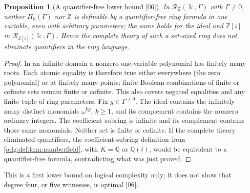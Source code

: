 \documentclass[11pt,oneside]{article}
\numberwithin{equation}{section}
\newtheorem{proposition}[proposition]{Proposition}
\theoremstyle{definition}
\theoremstyle{remark}
\newcommand{\Z}{\mathbb Z}
\newcommand{\Q}{\mathbb Q}
\newcommand{\src}[1]{\textup{\textsf{\small[#1]}}}
\begin{document}
\begin{proposition}[A quantifier-free lower bound \src{06}]\label{odg:def:prop:notqf}
In $\mathcal R_\Z(\Bbbk,\Gamma)$ with $\Gamma\ne0$, neither $\Pi_\Bbbk(\Gamma)$ nor
$\Z$ is definable by a quantifier-free ring formula in one variable, even with
arbitrary parameters; the same holds for the ideal and $\Z[i]$ in
$\mathcal R_{\Z[i]}(\Bbbk,\Gamma)$. Hence the complete theory of such a
set-sized ring does not eliminate quantifiers in the ring language.
\end{proposition}
\begin{proof}
In an infinite domain a nonzero one-variable polynomial has finitely many
roots. Each atomic equality is therefore true either everywhere (the
zero polynomial) or at finitely many points; finite Boolean combinations
of finite or cofinite sets remain finite or cofinite. This also covers
negated equalities and any finite tuple of ring parameters.
Fix $g\in\Gamma^{>0}$. The ideal contains the infinitely many distinct
monomials $\omega^{kg}$, $k\ge1$, and its complement contains the nonzero
ordinary integers. The coefficient subring is infinite and its complement
contains those same monomials. Neither set is finite or cofinite. If the
complete theory eliminated quantifiers, the coefficient-subring definition
from \cref{odg:def:thm:numberfield}, with $K=\Q$ or $\Q(i)$, would be
equivalent to a quantifier-free formula, contradicting what was just proved.
\end{proof}

This is a first lower bound on logical complexity only; it does not show that
degree four, or five witnesses, is optimal \src{06}.
\end{document}
